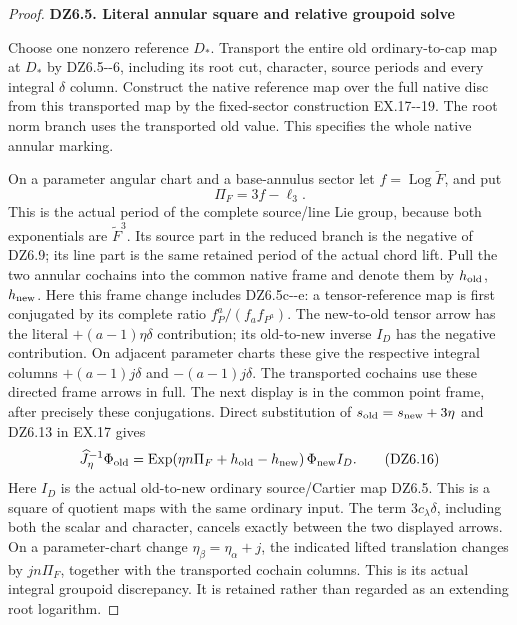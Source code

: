 \begin{proof}
\par

\medskip\noindent\textbf{DZ6.5. Literal annular square and relative groupoid solve}

\par\nobreak

Choose one nonzero reference \(D_*\). Transport the entire old
ordinary-to-cap map at \(D_*\) by DZ6.5-\/-6, including its root
cut, character, source periods and every integral \(\delta\)
column. Construct the native reference map over the full native
disc from this transported map by the fixed-sector construction
EX.17-\/-19. The root norm branch uses the transported old value.
This specifies the whole native annular marking.

On a parameter angular chart and a base-annulus sector let
\(f=\operatorname{Log}\widetilde F\), and put
\[
                 \Pi_F=3f-\ell_3.
 \tag{DZ6.15}
\]
This is the actual period of the complete source/line Lie group,
because both exponentials are \(\widetilde F^3\).
Its source part in the reduced branch is the negative of DZ6.9;
its line part is the same retained period of the actual chord
lift. Pull the two annular cochains into the common native frame
and denote them by \(h_{\rm old}\), \(h_{\rm new}\).
Here this frame change includes DZ6.5c-\/-e: a tensor-reference
map is first conjugated by its complete ratio
\(f_P^a/(f_a f_{P^a})\). The new-to-old tensor arrow has the
literal \(+(a-1)\eta\delta\) contribution; its old-to-new
inverse \(I_D\) has the negative contribution. On adjacent
parameter charts these give the respective integral columns
\(+(a-1)j\delta\) and \(-(a-1)j\delta\). The transported
cochains use these directed frame arrows in full. The next
display is in the common point frame, after precisely these
conjugations.
Direct substitution of \(s_{\rm old}=s_{\rm new}+3\eta\)
and DZ6.13 in EX.17 gives
\[
 \widehat J_\eta^{-1}\Phi_{\rm old}
  =\operatorname{Exp}\!
     \left(\eta n\Pi_F+h_{\rm old}-h_{\rm new}\right)
      \Phi_{\rm new}I_D .
 \tag{DZ6.16}
\]
Here \(I_D\) is the actual old-to-new ordinary source/Cartier
map DZ6.5. This is a square of quotient maps with the same
ordinary input. The term \(3c_\lambda\delta\), including
both the scalar and character, cancels exactly between the two
displayed arrows. On a parameter-chart change
\(\eta_\beta=\eta_\alpha+j\), the indicated lifted translation
changes by \(jn\Pi_F\), together with the transported cochain
columns. This is its actual integral groupoid discrepancy.
It is retained rather than regarded as an extending root
logarithm.


\end{proof}
